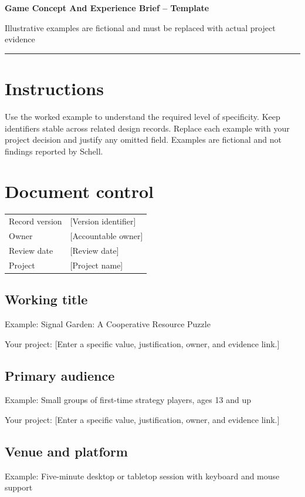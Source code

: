\documentclass[11pt]{article}
\begin{document}
{\huge\bfseries\color{suiteblue} Game Concept And Experience Brief -- Template}\par
\vspace{0.15in}
{\normalsize\color{suitegray} Illustrative examples are fictional and must be replaced with actual project evidence}\par
\vspace{0.15in}\hrule\vspace{0.15in}

\section{Instructions}
Use the worked example to understand the required level of specificity. Keep identifiers stable across related design records. Replace each example with your project decision and justify any omitted field. Examples are fictional and not findings reported by Schell.


\section{Document control}
\begin{tabularx}{\linewidth}{@{}lX@{}}\toprule Record version & [Version identifier]\\ Owner & [Accountable owner]\\ Review date & [Review date]\\ Project & [Project name]\\\bottomrule\end{tabularx}

\subsection{Working title}
Example: Signal Garden: A Cooperative Resource Puzzle

Your project: [Enter a specific value, justification, owner, and evidence link.]


\subsection{Primary audience}
Example: Small groups of first-time strategy players, ages 13 and up

Your project: [Enter a specific value, justification, owner, and evidence link.]


\subsection{Venue and platform}
Example: Five-minute desktop or tabletop session with keyboard and mouse support
\end{document}
